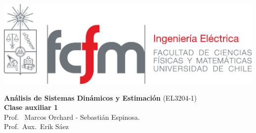 \documentclass[
  11pt,
  letterpaper,
   addpoints,
   answers
  ]{exam}
\begin{document}
\noindent
\begin{minipage}{0.47\textwidth}
\includegraphics[width=\textwidth]{../fcfm_die}
\end{minipage}
\begin{minipage}{0.53\textwidth}
\begin{center} 
\large\textbf{Análisis de Sistemas Dinámicos y Estimación} (EL3204-1) \\
\large\textbf{Clase auxiliar 1} \\
\normalsize Prof.~ Marcos Orchard - Sebastián Espinosa.\\
\normalsize Prof.~Aux.~Erik Sáez
\end{center}
\end{minipage}

\vspace{0.5cm}
\noindent
\vspace{.85cm}
\end{document}
